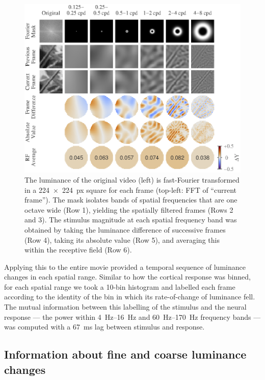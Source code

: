 \begin{figure}[htbp]
\centering \includegraphics[scale=1.2]{paperfigs/fig4.eps}
%
\caption{
The luminance of the original video (left) is fast-Fourier transformed in a \SI{224x224}{px} square for each frame (top-left: \ac{FFT} of  ``current frame'').
The mask isolates bands of spatial frequencies that are one octave wide (Row 1), yielding the spatially filtered frames (Rows 2 and 3).
The stimulus magnitude at each spatial frequency band was obtained by taking the luminance difference of successive frames (Row 4), taking its absolute value (Row 5), and averaging this within the receptive field (Row 6).
}%
\label{fig:lam_spares_method}
%
\end{figure}

Applying this to the entire movie provided a temporal sequence of luminance changes in each spatial range.
Similar to how the cortical response was binned, for each spatial range we took a \num{10}-bin histogram and labelled each frame according to the identity of the bin in which its rate-of-change of luminance fell.
The mutual information between this labelling of the stimulus and the neural response --- the power within \SIrange{4}{16}{Hz} and \SIrange{60}{170}{Hz} frequency bands --- was computed with a \SI{67}{\milli\second} lag between stimulus and response.


\subsection{Information about fine and coarse luminance changes}

